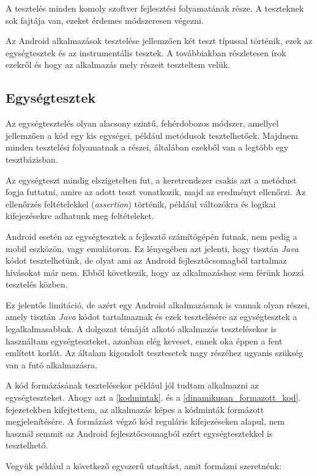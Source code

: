 \documentclass[12pt,a4paper]{article}
\begin{document}
	A tesztelés minden komoly szoftver fejlesztési folyamatának része. A teszteknek sok fajtája van, ezeket érdemes módszeresen végezni. 
	
	Az Android alkalmazások tesztelése jellemzően két teszt típussal történik, ezek az egységtesztek és az instrumentális tesztek. A továbbiakban részletesen írok ezekről és hogy az alkalmazás mely részeit teszteltem velük. 

	\subsection{Egységtesztek}
	
	Az egységtesztelés olyan alacsony szintű, fehérdobozos módszer, amellyel jellemzően a kód egy kis egységei, például metódusok tesztelhetőek. Majdnem minden tesztelési folyamatnak a részei, általában ezekből van a legtöbb egy tesztbázisban.  
	
	Az egységteszt mindig elszigetelten fut, a keretrendszer csakis azt a metódust fogja futtatni, amire az adott teszt vonatkozik, majd az eredményt ellenőrzi. Az ellenőrzés feltételekkel (\textit{assertion}) történik, például változókra és logikai kifejezésekre adhatunk meg feltételeket.
	
	Android esetén az egységtesztek a fejlesztő számítógépén futnak, nem pedig a mobil eszközön, vagy emulátoron. Ez lényegében azt jelenti, hogy tisztán \textit{Java} kódot tesztelhetünk, de olyat ami az Android fejlesztőcsomagból tartalmaz hívásokat már nem. Ebből következik, hogy az alkalmazáshoz sem férünk hozzá tesztelés közben.
	
	Ez jelentős limitáció, de azért egy Android alkalmazásnak is vannak olyan részei, amely tisztán \textit{Java} kódot tartalmaznak és ezek tesztelésére az egységtesztek a legalkalmasabbak. A dolgozat témáját alkotó alkalmazás tesztelésekor is használtam egységteszteket, azonban elég keveset, ennek oka éppen a fent említett korlát. Az általam kigondolt tesztesetek nagy részéhez ugyanis szükség van a futó alkalmazásra.
	
	A kód formázásának tesztelésekor például jól tudtam alkalmazni az egységteszteket. Ahogy azt a \ref{kodmintak}. és a \ref{dinamikusan_formazott_kod}. fejezetekben kifejtettem, az alkalmazás képes a kódminták formázott megjelenítésére. A formázást végző kód reguláris kifejezéseken alapul, nem használ semmit az Android fejlesztőcsomagból ezért egységtesztekkel is tesztelhető.
	
	Vegyük például a következő egyszerű utasítást, amit formázni szeretnénk:
	
\end{document}
